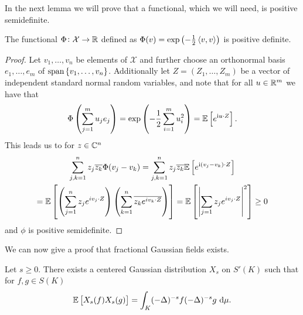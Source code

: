 In the next lemma we will prove that a functional, which we will need, is positive semidefinite.
\begin{lemma}\label{LambdaPosDefinite}
	The functional $\Phi \colon\mathcal{X} \to \mathbb{R}$ defined as  $\Phi(v) = \exp\left(-\frac{1}{2} \left\langle v, v \right\rangle \right)$ is positive definite.
\end{lemma}
\begin{proof}
	Let $v_1, \ldots, v_n$ be elements of $\mathcal{X}$ and further choose an orthonormal basis $e_1, \ldots, e_m$ of $\text{span}\cbr{v_1, \ldots, v_n}$. Additionally let $Z = (Z_1, \ldots, Z_m)$ be a vector of independent standard normal random variables, and note that for all $u \in \mathbb{R}^{m}$ we have that
	\begin{equation}
		\Phi \left(\sum_{j = 1}^{m} u_j e_j\right) = \exp \left(-\frac{1}{2} \sum_{i = 1}^{m} u_i^2\right) = \e \left[e^{ \img u \cd Z}\right].
	\end{equation}
	This leads us to for $z \in \mathbb{C}^{n}$ 
	\begin{multline}
		\sum_{j, k = 1}^{n}z_j \overline{z_k} \Phi(v_j - v_k) = \sum_{j,  k = 1}^{n} z_j \overline{z_k} \e \left[e^{\img (v_j -v_k) \cd Z}\right] \\
		= \e \left[\left(\sum_{j = 1}^{n} z_j e^{iv_j \cd Z}\right)\left(\sum_{k = 1}^{n}\overline{z_k e^{iv_k \cd Z}}\right)\right]= \e \left[ \: \abs{\sum_{j = 1} z_j e^{i v_j \cdot Z}}^2\right] \geq 0
	\end{multline}
	and $\phi$ is positive semidefinite.
\end{proof}

\medskip
We can now give a proof that fractional Gaussian fields exists.

\medskip
\begin{theorem}
	Let $s \geq 0$. There exists a centered Gaussian distribution $X_s$ on $S'(K)$ such that for $f,g \in S(K)$
	\begin{equation}
		\mathbb{E} \left[X_s(f)X_s(g) \right] = \int_{K} (-\Delta)^{-s}f (-\Delta)^{-s}g \ \text{d} \mu.
	\end{equation}
\end{theorem}

